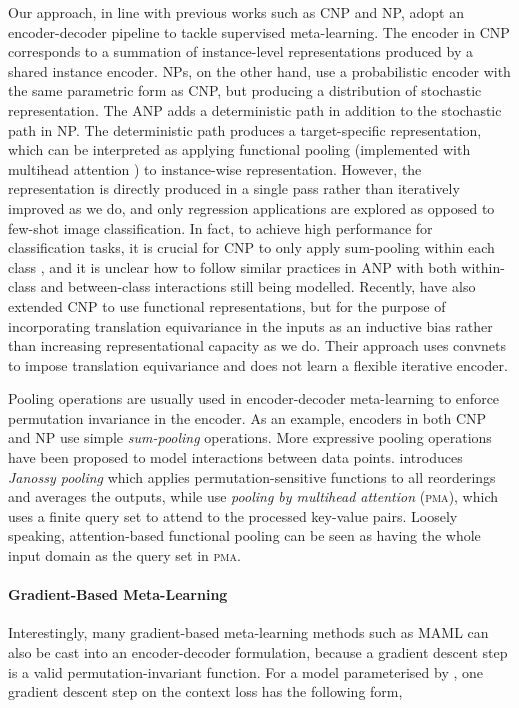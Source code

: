 \documentclass{article}
\theoremstyle{definition}
\begin{document}
Our approach, in line with previous works such as \gls{CNP} and \gls{NP}, adopt an encoder-decoder pipeline to tackle supervised meta-learning.
The encoder in \gls{CNP} corresponds to a summation of instance-level representations produced by a shared instance encoder.
\Gls{NP}s, on the other hand, use a probabilistic encoder with the same parametric form as \gls{CNP}, but producing a distribution of stochastic representation.
The \gls{ANP} \citep{kim2019attentive} adds a deterministic path in addition to the stochastic path in \gls{NP}. The deterministic path produces a target-specific representation, which can be interpreted as
applying functional pooling (implemented with multihead attention \citep{vaswani2017attention}) to instance-wise representation. However, the representation is directly produced in a single pass rather than iteratively improved as we do, and only regression applications are explored as opposed to few-shot image classification. 
In fact, to achieve high performance for classification tasks, it is crucial for \gls{CNP} to only apply sum-pooling within each class \citep{garnelo2018conditional}, and it is unclear how to follow similar practices in \gls{ANP} with both within-class and between-class interactions still being modelled.
Recently, \citet{gordon2019convolutional} have also extended \gls{CNP} to use functional representations, but for the purpose of incorporating translation equivariance in the inputs as an inductive bias rather than increasing representational capacity as we do. Their approach uses convnets to impose translation equivariance and does not learn a flexible iterative encoder.

Pooling operations are usually used in encoder-decoder meta-learning to enforce permutation invariance in the encoder.
As an example, encoders in both \gls{CNP} and \gls{NP} use simple \emph{sum-pooling} operations. 
More expressive pooling operations have been proposed to model interactions between data points.
\citet{murphy2019janossy} introduces \emph{Janossy pooling} which applies permutation-sensitive functions to all reorderings and averages the outputs, while \citet{lee2019set} use \emph{pooling by multihead attention} (\textsc{pma}), which uses a finite query set to attend to the processed key-value pairs. Loosely speaking, attention-based functional pooling can be seen as having the whole input domain  as the query set in \textsc{pma}.

\paragraph{Gradient-Based Meta-Learning}
Interestingly, many gradient-based meta-learning methods such as \gls{MAML} can also be cast into an encoder-decoder formulation, because a gradient descent step is a valid permutation-invariant function. For a model  parameterised by , one gradient descent step on the context loss has the following form,
\end{document}
